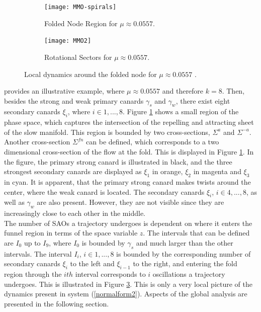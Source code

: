 %

\begin{figure}[h!]
	\centering
	\begin{subfigure}[t]{0.45\textwidth}
		\centering
			\texttt{[image: MMO-spirals]}
		\caption{Folded Node Region for $\mu \approx0.0557$.}
		\label{fig: MMo1pic}
	\end{subfigure}
	\hfill
	\begin{subfigure}[t]{0.45\textwidth}
			\texttt{[image: MMO2]}
		\caption{Rotational Sectors for $\mu \approx 0.0557$.}
		\label{fig: MMo2pic} 
	\end{subfigure}
\caption{Local dynamics around the folded node for $\mu \approx 0.0557$ \citep{MMO}.}
\end{figure}\newpage


\citet{MMO} provides an illustrative example, where $ \mu \approx 0.0557$ and therefore $k=8$. Then, besides the strong and weak primary canards $\gamma_s$ and $\gamma_w$, there exist eight secondary canards $\xi_i$, where $ i \in 1,...,8$.
Figure \ref{fig: MMo1pic} shows a small region of the phase space, which captures the intersection of the repelling and attracting sheet of the slow manifold. This region is bounded by two cross-sections, $\Sigma^a$ and $\Sigma^{-a}$.
Another cross-section $\Sigma^{fn}$ can be defined, which corresponds to a two dimensional cross-section of the flow at the fold. This is displayed in Figure \ref{fig: MMo1pic}. In the figure, the primary strong canard is illustrated in black, and the three strongest secondary canards are displayed as $\xi_1$ in orange, $\xi_2$ in magenta and $\xi_3$ in cyan. It is apparent, that the primary strong canard makes  twists around the center, where the weak canard is located. The secondary canards $\xi_i$, $ i \in 4,...,8$, as well as $\gamma_w$ are also present. However, they are not visible since they are increasingly close to each other in the middle.\\

The number of SAOs a trajectory undergoes is dependent on where it enters the funnel region in terms of the space variable $z$. The intervals that can be defined are $I_0$ up to $I_9$, where $I_0$ is bounded by $\gamma_s$ and much larger than the other intervals. The interval $I_i$, $i \in 1, ..., 8$ is bounded by the corresponding number of secondary canards $\xi_i$ to the left and $\xi_{i-1}$ to the right, and entering the fold region through the $ith$ interval corresponds to $i$ oscillations a trajectory undergoes. This is illustrated in Figure \ref{fig: MMo2pic}. This is only a very local picture of the dynamics present in system (\ref{normalform2}). Aspects of the global analysis are presented in the following section.
